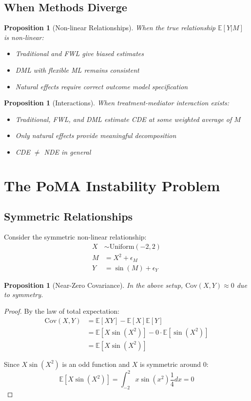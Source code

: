 \documentclass[11pt,a4paper]{article}
\newtheorem{proposition}[theorem]{Proposition}
\newcommand{\E}{\mathbb{E}}
\newcommand{\Cov}{\text{Cov}}
\begin{document}
\subsection{When Methods Diverge}

\begin{proposition}[Non-linear Relationships]
When the true relationship $\E[Y|M]$ is non-linear:
\begin{itemize}
    \item Traditional and FWL give biased estimates
    \item DML with flexible ML remains consistent
    \item Natural effects require correct outcome model specification
\end{itemize}
\end{proposition}

\begin{proposition}[Interactions]
When treatment-mediator interaction exists:
\begin{itemize}
    \item Traditional, FWL, and DML estimate CDE at some weighted average of $M$
    \item Only natural effects provide meaningful decomposition
    \item CDE $\neq$ NDE in general
\end{itemize}
\end{proposition}

\section{The PoMA Instability Problem}

\subsection{Symmetric Relationships}

Consider the symmetric non-linear relationship:
\begin{align}
X &\sim \text{Uniform}(-2, 2) \\
M &= X^2 + \epsilon_M \\
Y &= \sin(M) + \epsilon_Y
\end{align}

\begin{proposition}[Near-Zero Covariance]
In the above setup, $\Cov(X,Y) \approx 0$ due to symmetry.
\end{proposition}

\begin{proof}
By the law of total expectation:
\begin{align}
\Cov(X,Y) &= \E[XY] - \E[X]\E[Y] \\
&= \E[X \sin(X^2)] - 0 \cdot \E[\sin(X^2)] \\
&= \E[X \sin(X^2)]
\end{align}

Since $X \sin(X^2)$ is an odd function and $X$ is symmetric around 0:
\begin{equation}
\E[X \sin(X^2)] = \int_{-2}^{2} x \sin(x^2) \frac{1}{4} dx = 0
\end{equation}
\end{proof}
\end{document}
